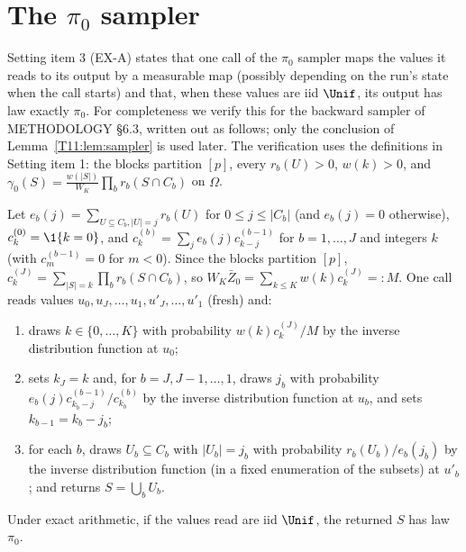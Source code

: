 \documentclass[11pt]{report}
\begin{document}
\section{The $\pi_0$ sampler}

Setting item 3 (EX-A) states that one call of the $\pi_0$ sampler maps the values it reads to its output by a
measurable map (possibly depending on the run's state when the call starts) and that, when these values are iid
$\Unif$, its output has law exactly $\pi_0$. For completeness we verify this for the backward sampler of METHODOLOGY \S6.3, written out as follows; only the
conclusion of Lemma~\ref{T11:lem:sampler} is used later. The verification uses the definitions in Setting item 1: the
blocks partition $[p]$, every $r_b(U)>0$, $w(k)>0$, and $\gamma_0(S)=\frac{w(|S|)}{W_K}\prod_br_b(S\cap C_b)$ on
$\Omega$.

Let $e_b(j)=\sum_{U\subseteq C_b,|U|=j}r_b(U)$ for $0\le j\le|C_b|$ (and $e_b(j)=0$ otherwise), $c^{(0)}_k=\1\{k=0\}$,
and $c^{(b)}_k=\sum_j e_b(j)c^{(b-1)}_{k-j}$ for $b=1,\dots,J$ and integers $k$ (with $c^{(b-1)}_m=0$ for $m<0$). Since
the blocks partition $[p]$, $c^{(J)}_k=\sum_{|S|=k}\prod_b r_b(S\cap C_b)$, so
$W_K\bar Z_0=\sum_{k\le K}w(k)c^{(J)}_k=:M$. One call reads values $u_0,u_J,\dots,u_1,u'_J,\dots,u'_1$ (fresh) and:
\begin{enumerate}[label=(\alph*)]
\item draws $k\in\{0,\dots,K\}$ with probability $w(k)c^{(J)}_k/M$ by the inverse distribution function at $u_0$;
\item sets $k_J=k$ and, for $b=J,J-1,\dots,1$, draws $j_b$ with probability $e_b(j)c^{(b-1)}_{k_b-j}/c^{(b)}_{k_b}$ by the
inverse distribution function at $u_b$, and sets $k_{b-1}=k_b-j_b$;
\item for each $b$, draws $U_b\subseteq C_b$ with $|U_b|=j_b$ with probability $r_b(U_b)/e_b(j_b)$ by the inverse
distribution function (in a fixed enumeration of the subsets) at $u'_b$; and returns $S=\bigcup_bU_b$.
\end{enumerate}

\begin{T11lemma}\label{T11:lem:sampler}
Under exact arithmetic, if the values read are iid $\Unif$, the returned $S$ has law $\pi_0$.
\end{T11lemma}
\end{document}
